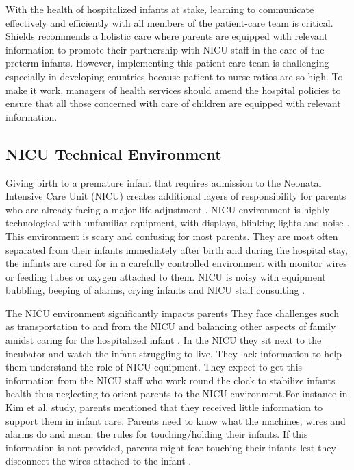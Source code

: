 With the health of hospitalized infants at stake, learning to communicate effectively and efficiently with all members of the patient-care team is critical. Shields \citep{Shields2015} recommends a holistic care where parents are equipped with relevant information to promote their partnership with NICU staff in the care of the preterm infants. However, implementing this patient-care team is challenging especially in developing countries because patient to nurse ratios are so high. To make it work, managers of health services should amend the hospital policies to ensure that all those concerned with care of children are equipped with relevant information.
  
\subsection{NICU Technical Environment}
Giving birth to a premature infant that requires admission to the Neonatal Intensive Care Unit (NICU) creates additional layers of responsibility for parents who are already facing a major life adjustment \citep{Barkin2010}. NICU environment is highly technological with unfamiliar equipment, with displays, blinking lights and noise \citep{Heidari2017}. This environment is scary and confusing for most parents. They are most often separated from their infants immediately after birth and during the hospital stay, the infants are cared for in a carefully controlled environment with monitor wires or feeding tubes or oxygen attached to them. NICU is noisy with equipment bubbling, beeping of alarms, crying infants and NICU staff consulting \citep{Rand2014}. 

The NICU environment significantly impacts parents \citep{Williams2018} They face challenges such as transportation to and from the NICU and balancing other aspects of family amidst caring for the hospitalized infant \citep{Mburu2018a}. In the NICU they sit next to the incubator and watch the infant struggling to live. They lack information to help them understand the role of NICU equipment. They expect to get this information from the NICU staff who work round the clock to stabilize infants health thus neglecting to orient parents to the NICU environment.For instance in Kim et al. \citep{Kim2015}  study, parents mentioned that they received little information to support them in infant care. Parents need to know what the machines, wires and alarms do and mean; the rules for touching/holding their infants. If this information is not provided, parents might fear touching their infants lest they disconnect the wires attached to the infant \citep{Arnold2013, KellyOBrien2014}.

